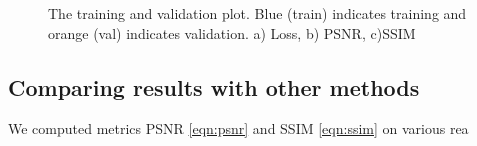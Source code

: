 \begin{figure}[h]
\caption{The training and validation plot. Blue (train) indicates training and orange (val) indicates validation. a) Loss, b) PSNR, c)SSIM}
\label{tab:vis_loss_metric}
\end{figure}

\subsection{Comparing results with other methods}
\label{comapring}
We computed metrics PSNR \eqref{eqn:psnr} and SSIM \eqref{eqn:ssim} on various rea